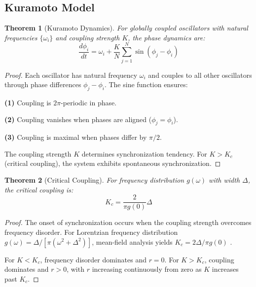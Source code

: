 \documentclass[11pt,twocolumn,a4paper]{article}
\newtheorem{theorem}{Theorem}[section]
\theoremstyle{definition}
\theoremstyle{remark}
\begin{document}
\subsection{Kuramoto Model}

\begin{theorem}[Kuramoto Dynamics]
\label{thm:kuramoto_dynamics}
For globally coupled oscillators with natural frequencies $\{\omega_i\}$ and coupling strength $K$, the phase dynamics are:
\begin{equation}
\frac{d\phi_i}{dt} = \omega_i + \frac{K}{N} \sum_{j=1}^N \sin(\phi_j - \phi_i)
\label{eq:kuramoto}
\end{equation}
\end{theorem}

\begin{proof}
Each oscillator has natural frequency $\omega_i$ and couples to all other oscillators through phase differences $\phi_j - \phi_i$. The sine function ensures:

\textbf{(1)} Coupling is $2\pi$-periodic in phase.

\textbf{(2)} Coupling vanishes when phases are aligned ($\phi_j = \phi_i$).

\textbf{(3)} Coupling is maximal when phases differ by $\pi/2$.

The coupling strength $K$ determines synchronization tendency. For $K > K_c$ (critical coupling), the system exhibits spontaneous synchronization.
\end{proof}

\begin{theorem}[Critical Coupling]
\label{thm:critical_coupling}
For frequency distribution $g(\omega)$ with width $\Delta$, the critical coupling is:
\begin{equation}
K_c = \frac{2}{\pi g(0)} \Delta
\label{eq:critical_coupling}
\end{equation}
\end{theorem}

\begin{proof}
The onset of synchronization occurs when the coupling strength overcomes frequency disorder. For Lorentzian frequency distribution $g(\omega) = \Delta/[\pi(\omega^2 + \Delta^2)]$, mean-field analysis yields $K_c = 2\Delta/\pi g(0)$ \citep{strogatz2000kuramoto}.

For $K < K_c$, frequency disorder dominates and $r = 0$. For $K > K_c$, coupling dominates and $r > 0$, with $r$ increasing continuously from zero as $K$ increases past $K_c$.
\end{proof}
\end{document}
